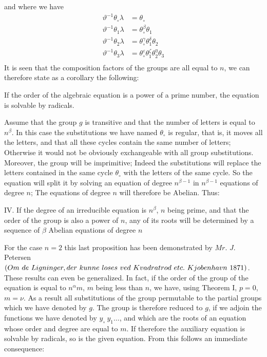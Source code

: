 \documentclass[11pt,fancy]{elegantbook}
\begin{document}
and where we have 
\begin{equation}
    \begin{aligned}
        \vartheta^{-1}\theta_\circ\lambda&=\theta_\circ \\
        \vartheta^{-1}\theta_1\lambda&=\theta_\circ^{\beta}\theta_1 \\
        \vartheta^{-1}\theta_2\lambda&=\theta_\circ^{\gamma}\theta_1^{\delta}\theta_2 \\
        \vartheta^{-1}\theta_3\lambda&=\theta_\circ^{\varepsilon}\theta_1^{\zeta}\theta_2^{\eta}\theta_3 \\
    \end{aligned}
\end{equation}
It is seen that the composition factors of the groups are all equal to $n$, we can therefore state as a corollary the following:
\begin{proposition}
If the order of the algebraic equation is a power of a prime number, the equation is solvable by radicals. 
\end{proposition}
Assume that the group $g$ is transitive and that the number of letters is equal to $n^\beta$. In this case the substitutions we have named $\theta_\circ$ is regular, that is, it moves all the letters, and that all these cycles contain the same number of letters; Otherwise it would not be obviously exchangeable with all group substitutions. Moreover, the group will be imprimitive; Indeed the substitutions will replace the letters contained in the same cycle $\theta_\circ$ with the letters of the same cycle. So the equation will split it by solving an equation of degree $n^{\beta-1}$ in $n^{\beta-1}$ equations of degree $n$; The equations of degree $n$ will therefore be Abelian. Thus:
\begin{theorem}
IV. If the degree of an irreducible equation is $n^\beta$, $n$ being prime, and that the order of the group is also a power of $n$, any of its roots will be determined by a sequence of $\beta$ Abelian equations of degree $n$
\end{theorem}
For the case $n=2$ this last proposition has been demonstrated by $Mr.$ $J.$ Petersen $(Om \ de \ Ligninger, \\ der \ kunne \ loses \  ved \ Kvadratrod  \ etc. \ Kjobenhavn \ 1871)$.
These results can even be generalized. In fact, if the order of the group of the equation is equal to $n^\alpha{m}$, $m$ being less than $n$, we have, using Theorem I, $p=0$, $m=\nu$. As a result all substitutions of the group permutable to the partial groups which we have denoted by $g$. The group is therefore reduced to $g$, if we adjoin the functions we have denoted by $y_\circ \ y_1  \dots$, and which are the roots of an equation whose order and degree are equal to $m$. If therefore the auxiliary equation is solvable by radicals, so is the given equation. From this follows an immediate consequence:
\end{document}
